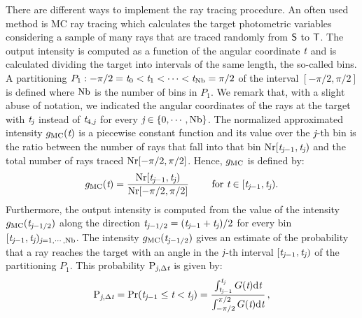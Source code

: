 There are different ways to implement the ray tracing procedure.
An often used method is MC ray tracing which calculates the target photometric variables considering a sample of many rays that are traced randomly from $\textsf{S}$ to $\textsf{T}$. The output intensity is computed as a function of the angular coordinate $\textit{t}$ and is calculated dividing the target into intervals of the same length, the so-called bins. A partitioning $P_1: -\pi/2 = \textit{t}_{0}<\textit{t}_{1}<\cdots <\textit{t}_{\textrm{Nb}}=\pi/2$ of the interval $[-\pi/2, \pi/2]$ is defined where $\textrm{Nb}$ is the number of bins in $P_1$.
We remark that, with a slight abuse of notation, we indicated the angular coordinates of the rays at the target with $\textit{t}_{\textit{j}}$ instead of $\textit{t}_{4,\textit{j}}$ for every $\textit{j}\in\{0, \cdots, \textrm{Nb}\}$.
The normalized approximated intensity $g_{\textrm{MC}}(\textit{t})$ is a piecewise constant function and its value over the $\textit{j}$-th bin is the ratio between the number of rays that fall into that bin
$\textrm{Nr}[\textit{t}_{\textit{j}-1},\textit{t}_{\textit{j}})$ and the total number of rays traced $\textrm{Nr}[-\pi/2, \pi/2]$.
Hence, $g_{\textrm{MC}}$ is defined by:
\begin{equation} \label{g_mc}
g_{\textrm{MC}}(\textit{t}) = \frac{\textrm{Nr}[\textit{t}_{\textit{j}-1},\textit{t}_{\textit{j}})}{\textrm{Nr}[-\pi/2, \pi/2]} \qquad \mbox{ for } \textit{t}\in[\textit{t}_{\textit{j}-1}, \textit{t}_{\textit{j}}).
\end{equation}
Furthermore, the output intensity is computed from the value of the intensity $g_{\textrm{MC}}(\textit{t}_{\textit{j}-1/2})$ along the direction $\textit{t}_{\textit{j}-1/2}=(\textit{t}_{\textit{j}-1}+\textit{t}_{\textit{j}})/2$ for every bin $[\textit{t}_{\textit{j}-1},\textit{t}_{\textit{j}})_{\textit{j} = 1, \cdots, \textrm{Nb}}$.
 The intensity $g_{\textrm{MC}}(\textit{t}_{\textit{j}-1/2})$ gives an estimate of the probability that a ray reaches the target with an angle in the $\textit{j}$-th interval $[\textit{t}_{\textit{j}-1}, \textit{t}_{\textit{j}})$ of the partitioning $P_1$. This probability $\textrm{P}_{\textit{j}, \Delta\textit{t}}$ is given by:
\begin{equation}\label{eq:probability}
\textrm{P}_{\textit{j}, \Delta\textit{t}} = \Pr(\textit{t}_{\textit{j}-1}\leq\textit{t}<\textit{t}_{\textit{j}})= \frac{\int_{\textit{t}_{\textit{j}-1}}^{\textit{t}_{\textit{j}}} G(\textit{t}) \textrm{d}\textit{t}}{\int_{-\pi/2}^{\pi/2}G(\textit{t}) \textrm{d}\textit{t}}\,,
\end{equation}
